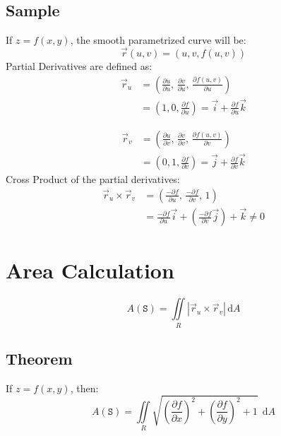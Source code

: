 \documentclass[12pt, fleqn]{book}
\newcommand{\D}{\mathrm{d}}
\newcommand{\rutrv}{\vec{r}_u \times \vec{r}_v\right}
\newcommand{\xy}{(x, y)}
\newcommand{\uv}{(u, v)}
\newcommand{\rond}[2]{\frac{\partial #1}{\partial #2}}
\begin{document}
		\subsection{Sample}
			If $z = f\xy$, the smooth parametrized curve will be:
			\begin{equation}
				\vec{r}\uv = (u, v, f\uv)
			\end{equation}
		Partial Derivatives are defined as:
		\begin{equation}
			\begin{split}
				\vec{r}_u 
				& = (
				\rond{u}{u}, \,
				\rond{v}{u}, \,
				\rond{f\uv}{u}
				) \\
				& = (1, 0, \rond{f}{u})
				= \vec{i} + \rond{f}{u} \vec{k}
			\end{split}
		\end{equation}

		\begin{equation}
			\begin{split}
				\vec{r}_v 
				& = (
				\rond{u}{v}, \,
				\rond{v}{v}, \,
				\rond{f\uv}{v}
				) \\
				& = (0, 1, \rond{f}{v})
				= \vec{j} + \rond{f}{v} \vec{k}
			\end{split}
		\end{equation}
		Cross Product of the partial derivatives:
		\begin{equation}
			\begin{split}
				\vec{r}_u \times \vec{r}_v 
				& = (
				\frac{- \partial f}{\partial u}, \, 
				\frac{- \partial f}{\partial v}, \, 
				1
				) \\
				& = \frac{- \partial f}{\partial u} \vec{i} +
				(\frac{- \partial f}{\partial v} \vec{j}) + 
				\vec{k} \neq 0
			\end{split}
		\end{equation}

	\section{Area Calculation}
		\begin{equation}
			A(\mathtt{S}) = \iint\limits_R \left|\rutrv| \, \D A
		\end{equation}
		\subsection{Theorem}
			If $z = f\xy$, then:
			\begin{equation}
				A(\mathtt{S}) = 
				\iint\limits_R 
				\sqrt{
					(\rond{f}{x})^2 + 
					(\rond{f}{y})^2 + 
					1
				} 
				\ \ \D A
			\end{equation}
\end{document}

